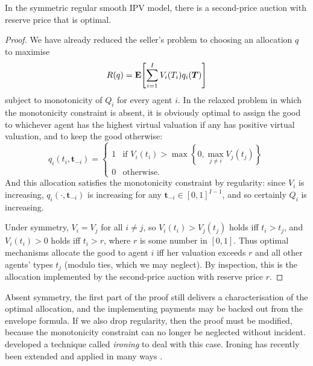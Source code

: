 \begin{theorem}
	\label{theorem:MyersonAuction}
	In the symmetric regular smooth IPV model,
	there is a second-price auction with reserve price
	that is optimal.
\end{theorem}

\begin{proof}
	We have already reduced the seller's problem to choosing an allocation $q$ to maximise
	\begin{equation*}
		R(q) = \E\left[ \sum_{i=1}^I V_i(T_i) q_i(\boldsymbol{T}) \right]
	\end{equation*}
	subject to monotonicity of $Q_i$ for every agent $i$.
	In the relaxed problem in which the monotonicity constraint is absent,
	it is obviously optimal
	to assign the good to whichever agent has the highest virtual valuation if any has positive virtual valuation, and to keep the good otherwise:
	\begin{equation*}
		q_i(t_i,\boldsymbol{t}_{-i})
		= 
		\begin{cases}
			1
			& \text{if $V_i(t_i) > \max\left\{ 0, \max_{j \neq i} V_j(t_j) \right\}$}
			\\
			0
			& \text{otherwise.}
		\end{cases}
	\end{equation*}
	And this allocation satisfies the monotonicity constraint
	by regularity:
	since $V_i$ is increasing,
	$q_i(\cdot,\boldsymbol{t}_{-i})$ is increasing for any $\boldsymbol{t}_{-i} \in [0,1]^{I-1}$,
	and so certainly $Q_i$ is increasing.

	Under symmetry, $V_i = V_j$ for all $i \neq j$,
	so $V_i(t_i) > V_j(t_j)$ holds iff $t_i > t_j$,
	and $V_i(t_i) > 0$ holds iff $t_i > r$, where $r$ is some number in $[0,1]$.
	Thus optimal mechanisms allocate the good to agent $i$ iff her valuation exceeds $r$ and all other agents' types $t_j$
	(modulo ties, which we may neglect).
	By inspection, this is the allocation implemented by the second-price auction with reserve price $r$.
\end{proof}


\begin{remark}
	\label{remark:Myerson_general}
	Absent symmetry, the first part of the proof still delivers a characterisation of the optimal allocation,
	and the implementing payments may be backed out from the envelope formula.
	If we also drop regularity, then the proof must be modified, because the monotonicity constraint can no longer be neglected without incident.
	\textcite{Myerson1981} developed a technique called \emph{ironing} to deal with this case.
	Ironing has recently been extended and applied in many ways
	\parencite[e.g.][]{Toikka2011,Condorelli2012,Condorelli2013,KleinerMoldovanuStrack2021,DworczakKominersAkbarpour2021,LoertscherMuir2022,OnuchicRay2022iron,JewittQuigleyInprogress}.
\end{remark}


